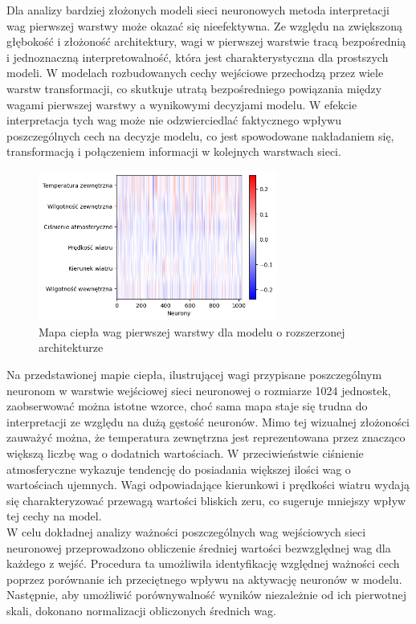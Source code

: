 \documentclass[a4paper,twoside,12pt]{book}
\begin{document}
Dla analizy bardziej złożonych modeli sieci neuronowych metoda interpretacji wag pierwszej warstwy może okazać się nieefektywna. Ze względu na zwiększoną głębokość i złożoność architektury, wagi w pierwszej warstwie tracą bezpośrednią i jednoznaczną interpretowalność, która jest charakterystyczna dla prostszych modeli. W modelach rozbudowanych cechy wejściowe przechodzą przez wiele warstw transformacji, co skutkuje utratą bezpośredniego powiązania między wagami pierwszej warstwy a wynikowymi decyzjami modelu. W efekcie interpretacja tych wag może nie odzwierciedlać faktycznego wpływu poszczególnych cech na decyzje modelu, co jest spowodowane nakładaniem się, transformacją i połączeniem informacji w kolejnych warstwach sieci.

\begin{figure}[!h]
  \centering
  \includegraphics[width=0.7\textwidth]{img/heatmap2.png}
  \caption{Mapa ciepła wag pierwszej warstwy dla modelu o rozszerzonej architekturze}
  \label{fig:etykieta-rysunku}
\end{figure}


Na przedstawionej mapie ciepła, ilustrującej wagi przypisane poszczególnym neuronom w warstwie wejściowej sieci neuronowej o rozmiarze 1024 jednostek, zaobserwować można istotne wzorce, choć sama mapa staje się trudna do interpretacji ze względu na dużą gęstość neuronów. Mimo tej wizualnej złożoności zauważyć można, że temperatura zewnętrzna jest reprezentowana przez znacząco większą liczbę wag o dodatnich wartościach. W przeciwieństwie ciśnienie atmosferyczne wykazuje tendencję do posiadania większej ilości wag o wartościach ujemnych. Wagi odpowiadające kierunkowi i prędkości wiatru wydają się charakteryzować przewagą wartości bliskich zeru, co sugeruje mniejszy wpływ tej cechy na model.\\

W celu dokładnej analizy ważności poszczególnych wag wejściowych sieci neuronowej przeprowadzono obliczenie średniej wartości bezwzględnej wag dla każdego z wejść. Procedura ta umożliwiła identyfikację względnej ważności cech poprzez porównanie ich przeciętnego wpływu na aktywację neuronów w modelu. Następnie, aby umożliwić porównywalność wyników niezależnie od ich pierwotnej skali, dokonano normalizacji obliczonych średnich wag.
\newpage
\end{document}
